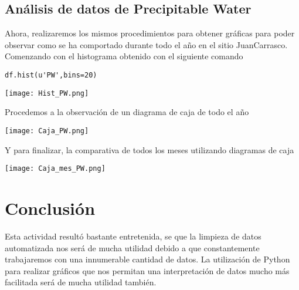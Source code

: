 \documentclass{article}
\begin{document}
\subsection{\huge Análisis de datos de Precipitable Water}
\bigskip
Ahora, realizaremos los mismos procedimientos para obtener gráficas para poder observar como se ha comportado durante todo el año en el sitio JuanCarrasco. Comenzando con el histograma obtenido con el siguiente comando\\
\begin{verbatim}
df.hist(u'PW',bins=20)
\end{verbatim}
\bigskip
\begin{center}
\texttt{[image: Hist\_PW.png]}
\end{center}
\bigskip
Procedemos a la observación de un diagrama de caja de todo el año\\
\begin{center}
\texttt{[image: Caja\_PW.png]}
\end{center}
\bigskip
Y para finalizar, la comparativa de todos los meses utilizando diagramas de caja\\
\begin{center}
\texttt{[image: Caja\_mes\_PW.png]}
\end{center}
\newpage

\section{\huge Conclusión}
Esta actividad resultó bastante entretenida, se que la limpieza de datos automatizada nos será de mucha utilidad debido a que constantemente trabajaremos con una innumerable cantidad de datos. La utilización de Python para realizar gráficos que nos permitan una interpretación de datos mucho más facilitada será de mucha utilidad también.
\end{document}
